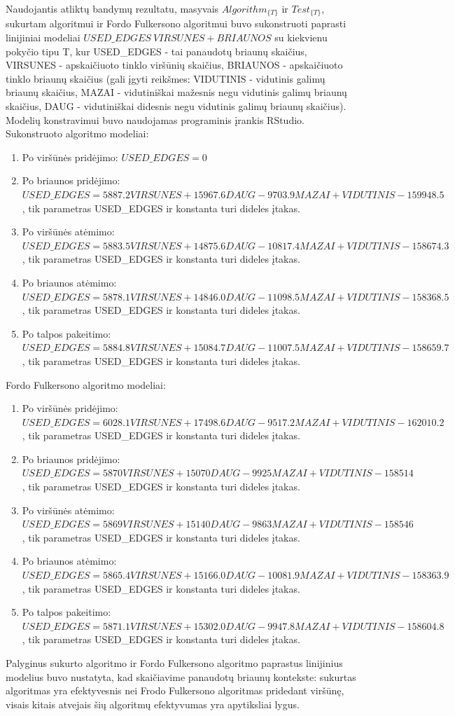 Naudojantis atliktų bandymų rezultatu, masyvais $Algorithm_{\{T\}}$ ir $Test_{\{T\}}$,  sukurtam algoritmui ir Fordo Fulkersono algoritmui buvo sukonstruoti paprasti linijiniai modeliai $USED\_EDGES ~ VIRSUNES + BRIAUNOS$ su kiekvienu pokyčio tipu T, kur USED\_EDGES - tai panaudotų briaunų skaičius, VIRSUNES - apskaičiuoto tinklo viršūnių skaičius, BRIAUNOS - apskaičiuoto tinklo briaunų skaičius (gali įgyti reikšmes: VIDUTINIS - vidutinis galimų briaunų skaičius, MAZAI - vidutiniškai mažesnis negu vidutinis galimų briaunų skaičius, DAUG - vidutiniškai didesnis negu vidutinis galimų briaunų skaičius). Modelių konstravimui buvo naudojamas programinis įrankis RStudio. Sukonstruoto algoritmo modeliai:
\begin{enumerate}
	\item Po viršūnės pridėjimo: $USED\_EDGES = 0$
	\item Po briaunos pridėjimo: $USED\_EDGES = 5887.2 VIRSUNES + 15967.6 DAUG - 9703.9 MAZAI + VIDUTINIS - 159948.5$, tik parametras USED\_EDGES ir konstanta turi dideles įtakas.
	\item Po viršūnės atėmimo: $USED\_EDGES = 5883.5 VIRSUNES + 14875.6 DAUG - 10817.4 MAZAI + VIDUTINIS - 158674.3$, tik parametras USED\_EDGES ir konstanta turi dideles įtakas.
	\item Po briaunos atėmimo: $USED\_EDGES = 5878.1 VIRSUNES + 14846.0 DAUG -11098.5 MAZAI + VIDUTINIS - 158368.5$, tik parametras USED\_EDGES ir konstanta turi dideles įtakas.
	\item Po talpos pakeitimo: $USED\_EDGES = 5884.8 VIRSUNES + 15084.7 DAUG - 11007.5 MAZAI + VIDUTINIS - 158659.7$, tik parametras USED\_EDGES ir konstanta turi dideles įtakas.
\end{enumerate}
Fordo Fulkersono algoritmo modeliai:
\begin{enumerate}
	\item Po viršūnės pridėjimo: $USED\_EDGES =6028.1 VIRSUNES + 17498.6 DAUG - 9517.2 MAZAI + VIDUTINIS - 162010.2$, tik parametras USED\_EDGES ir konstanta turi dideles įtakas.
	\item Po briaunos pridėjimo: $USED\_EDGES = 5870 VIRSUNES + 15070 DAUG - 9925 MAZAI + VIDUTINIS - 158514$, tik parametras USED\_EDGES ir konstanta turi dideles įtakas.
	\item Po viršūnės atėmimo: $USED\_EDGES = 5869 VIRSUNES + 15140DAUG -9863 MAZAI + VIDUTINIS - 158546$, tik parametras USED\_EDGES ir konstanta turi dideles įtakas.
	\item Po briaunos atėmimo: $USED\_EDGES = 5865.4 VIRSUNES + 15166.0 DAUG - 10081.9 MAZAI + VIDUTINIS - 158363.9$, tik parametras USED\_EDGES ir konstanta turi dideles įtakas.
	\item Po talpos pakeitimo: $USED\_EDGES = 5871.1 VIRSUNES + 15302.0 DAUG - 9947.8 MAZAI + VIDUTINIS - 158604.8$, tik parametras USED\_EDGES ir konstanta turi dideles įtakas.
\end{enumerate}

Palyginus sukurto algoritmo ir Fordo Fulkersono algoritmo paprastus linijinius modelius buvo nustatyta, kad skaičiavime panaudotų briaunų kontekste: sukurtas algoritmas yra efektyvesnis nei Frodo Fulkersono algoritmas pridedant viršūnę, visais kitais atvejais šių algoritmų efektyvumas yra apytiksliai lygus.